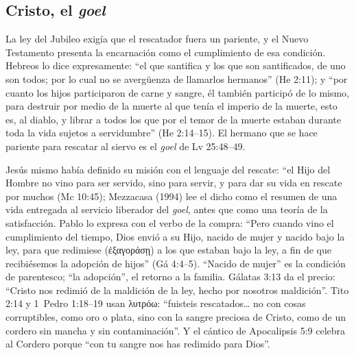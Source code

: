 \documentclass[11pt,letterpaper]{article}
\newcommand{\grc}[1]{\foreignlanguage{ancientgreek}{#1}}
\begin{document}
\subsection{Cristo, el \emph{goel}}
La ley del Jubileo exigía que el rescatador fuera un pariente, y el Nuevo Testamento presenta la encarnación como el cumplimiento de esa condición. Hebreos lo dice expresamente: ``el que santifica y los que son santificados, de uno son todos; por lo cual no se avergüenza de llamarlos hermanos'' (He 2:11); y ``por cuanto los hijos participaron de carne y sangre, él también participó de lo mismo, para destruir por medio de la muerte al que tenía el imperio de la muerte, esto es, al diablo, y librar a todos los que por el temor de la muerte estaban durante toda la vida sujetos a servidumbre'' (He 2:14--15). El hermano que se hace pariente para rescatar al siervo es el \emph{goel} de Lv 25:48--49.

Jesús mismo había definido su misión con el lenguaje del rescate: ``el Hijo del Hombre no vino para ser servido, sino para servir, y para dar su vida en rescate por muchos (Mc 10:45); Mezzacasa (1994) lee el dicho como el resumen de una vida entregada al servicio liberador del \emph{goel}, antes que como una teoría de la satisfacción. Pablo lo expresa con el verbo de la compra: ``Pero cuando vino el cumplimiento del tiempo, Dios envió a su Hijo, nacido de mujer y nacido bajo la ley, para que redimiese (\grc{ἐξαγοράσῃ}) a los que estaban bajo la ley, a fin de que recibiésemos la adopción de hijos'' (Gá 4:4--5). ``Nacido de mujer'' es la condición de parentesco; ``la adopción'', el retorno a la familia. Gálatas 3:13 da el precio: ``Cristo nos redimió de la maldición de la ley, hecho por nosotros maldición''. Tito 2:14 y 1~Pedro 1:18--19 usan \grc{λυτρόω}: ``fuisteis rescatados\ldots{} no con cosas corruptibles, como oro o plata, sino con la sangre preciosa de Cristo, como de un cordero sin mancha y sin contaminación''. Y el cántico de Apocalipsis 5:9 celebra al Cordero porque ``con tu sangre nos has redimido para Dios''.
\end{document}
